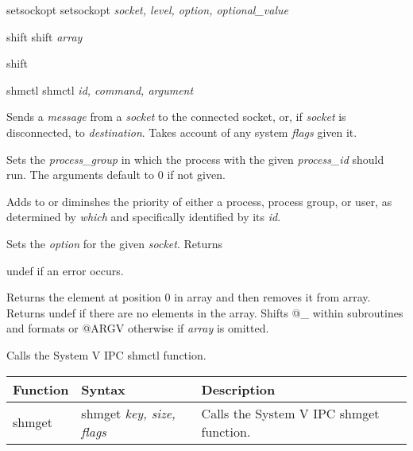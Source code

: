 \documentclass[a4paper,11pt]{book}
\begin{document}
\noindent 

\noindent 

\noindent 

\noindent setsockopt setsockopt \textit{socket, level, option, optional\_value}

\noindent 

\noindent shift shift \textit{array}

\noindent 

\noindent shift

\noindent 

\noindent 

\noindent 

\noindent 

\noindent shmctl shmctl \textit{id, command, argument}

\noindent 

\noindent Sends a \textit{message }from a \textit{socket }to the connected socket, or, if \textit{socket }is disconnected, to \textit{destination}. Takes account of any system \textit{flags }given it.

\noindent 

\noindent Sets the \textit{process\_group }in which the process with the given \textit{process\_id }should run. The arguments default to 0 if not given.

\noindent 

\noindent Adds to or diminshes the priority of either a process, process group, or user, as determined by \textit{which }and specifically identified by its \textit{id}.

\noindent 

\noindent Sets the \textit{option }for the given \textit{socket}. Returns

\noindent undef if an error occurs.

\noindent 

\noindent 

\noindent Returns the element at position 0 in array and then removes it from array. Returns undef if there are no elements in the array. Shifts @\_ within subroutines and formats or @ARGV otherwise if \textit{array }is omitted.

\noindent 

\noindent Calls the System V IPC shmctl function.

\noindent 

\noindent 

\noindent 

\begin{tabular}{|p{0.9in}|p{1.3in}|p{2.0in}|} \hline 
\textbf{Function} & \textbf{Syntax} & \textbf{Description} \\ \hline 
shmget & shmget \textit{key, size, flags} & Calls the System V IPC shmget function. \\ \hline 
\end{tabular}
\end{document}
